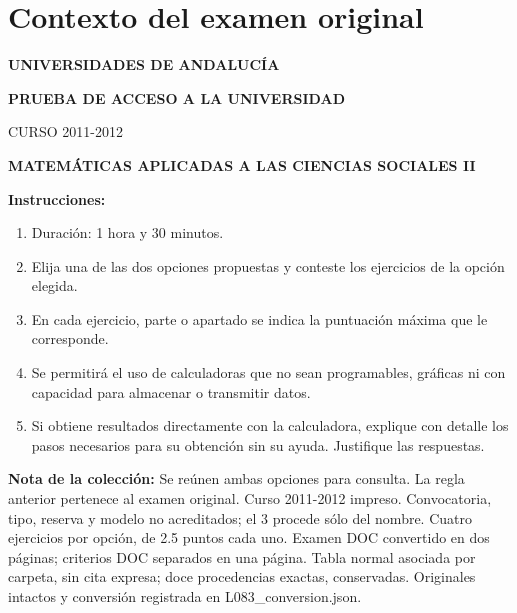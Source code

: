\section*{Contexto del examen original}
\textbf{UNIVERSIDADES DE ANDALUCÍA}\par
\textbf{PRUEBA DE ACCESO A LA UNIVERSIDAD}\par
CURSO 2011-2012\par
\textbf{MATEMÁTICAS APLICADAS A LAS CIENCIAS SOCIALES II}

\textbf{Instrucciones:}
\begin{enumerate}[label=\textbf{\alph*)}]
  \item Duración: 1 hora y 30 minutos.
  \item Elija una de las dos opciones propuestas y conteste los ejercicios de la opción elegida.
  \item En cada ejercicio, parte o apartado se indica la puntuación máxima que le corresponde.
  \item Se permitirá el uso de calculadoras que no sean programables, gráficas ni con capacidad para almacenar o transmitir datos.
  \item Si obtiene resultados directamente con la calculadora, explique con detalle los pasos necesarios para su obtención sin su ayuda. Justifique las respuestas.
\end{enumerate}
\noindent\textbf{Nota de la colección:} Se reúnen ambas opciones para consulta. La regla anterior pertenece al examen original. Curso 2011-2012 impreso. Convocatoria, tipo, reserva y modelo no acreditados; el 3 procede sólo del nombre. Cuatro ejercicios por opción, de 2.5 puntos cada uno. Examen DOC convertido en dos páginas; criterios DOC separados en una página. Tabla normal asociada por carpeta, sin cita expresa; doce procedencias exactas, conservadas. Originales intactos y conversión registrada en L083\_conversion.json.
\par\medskip
